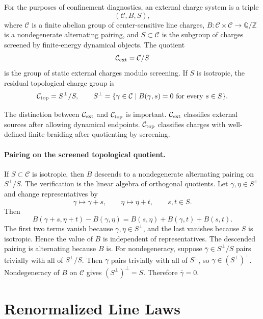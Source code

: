 \begin{definition}
\label{def:external-charge-system}
For the purposes of confinement diagnostics, an external charge system is a
triple
\[
  (\mathcal C,B,S),
\]
where \(\mathcal C\) is a finite abelian group of center-sensitive line
charges, \(B:\mathcal C\times\mathcal C\to\mathbb Q/\mathbb Z\) is a
nondegenerate alternating pairing, and \(S\subset\mathcal C\) is the subgroup
of charges screened by finite-energy dynamical objects.  The quotient
\[
  \mathcal C_{\rm ext}=\mathcal C/S
\]
is the group of static external charges modulo screening.  If \(S\) is
isotropic, the residual topological charge group is
\[
  \mathcal C_{\rm top}=S^\perp/S,
  \qquad
  S^\perp=\{\gamma\in\mathcal C\mid B(\gamma,s)=0
  \text{ for every }s\in S\}.
\]
\end{definition}

The distinction between \(\mathcal C_{\rm ext}\) and
\(\mathcal C_{\rm top}\) is important.  \(\mathcal C_{\rm ext}\) classifies
external sources after allowing dynamical endpoints.  \(\mathcal C_{\rm top}\)
classifies charges with well-defined finite braiding after quotienting by
screening.

\paragraph{Pairing on the screened topological quotient.}
If \(S\subset\mathcal C\) is isotropic, then \(B\) descends to a
nondegenerate alternating pairing on \(S^\perp/S\).
The verification is the linear algebra of orthogonal quotients.  Let
\(\gamma,\eta\in S^\perp\) and change representatives by
\[
  \gamma\mapsto\gamma+s,\qquad \eta\mapsto\eta+t,
  \qquad s,t\in S .
\]
Then
\[
  B(\gamma+s,\eta+t)-B(\gamma,\eta)
  =
  B(s,\eta)+B(\gamma,t)+B(s,t).
\]
The first two terms vanish because \(\gamma,\eta\in S^\perp\), and the last
vanishes because \(S\) is isotropic.  Hence the value of \(B\) is independent
of representatives.  The descended pairing is alternating because \(B\) is.
For nondegeneracy, suppose \(\bar\gamma\in S^\perp/S\) pairs trivially with
all of \(S^\perp/S\).  Then \(\gamma\) pairs trivially with all of
\(S^\perp\), so \(\gamma\in(S^\perp)^\perp\).  Nondegeneracy of \(B\) on
\(\mathcal C\) gives \((S^\perp)^\perp=S\).  Therefore
\(\bar\gamma=0\).

\section{Renormalized Line Laws}

